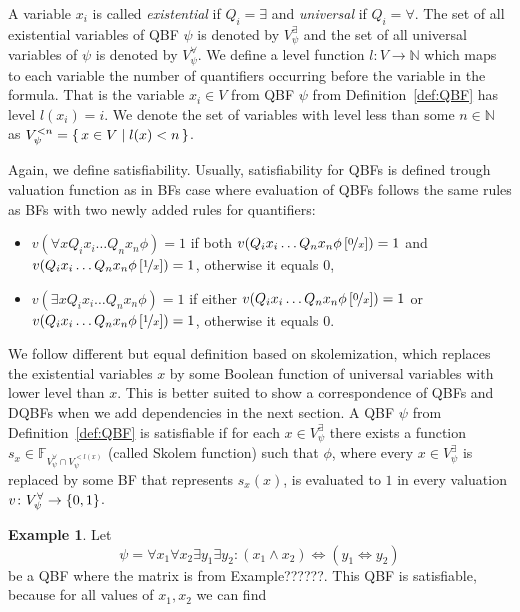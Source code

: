\documentclass[
  digital, %
  twoside, %
  table,   %
  nolof,     %
  nolot,     %
]{fithesis3}
\let\setbuilder\set
\newcommand{\simpleset}[1]{\{{#1}\}}
\renewcommand{\set}[1]{\normalexpandarg\IfSubStr{#1}{|}{\setbuilder{#1}}{\simpleset{#1}}}
\theoremstyle{definition}
\newtheorem{example}{Example}
\theoremstyle{remark}
\newcommand{\substitute}[2]{\left[ \nicefrac{#2}{#1} \right]}
\newcommand{\BFuncs}[1]{\mathbb{F}_{#1}}
\newcommand{\evars}[1]{V_{#1}^{\exists}}
\newcommand{\uvars}[1]{V_{#1}^{\forall}}
\newcommand{\lequal}{\Leftrightarrow}
\begin{document}
A variable $x_i$ is called \emph{existential} if $Q_i = \exists$ and \emph{universal} if $Q_i = \forall$. The set of all existential variables of QBF $\psi$ is denoted by $\evars{\psi}$ and the set of all universal variables of $\psi$ is denoted by $\uvars{\psi}$. We define a level function $l\colon V \to \mathbb{N}$ which maps to each variable the number of quantifiers occurring before the variable in the formula. That is the variable $x_i \in V$ from QBF $\psi$ from Definition~\ref{def:QBF} has level $l(x_i) = i$. We denote the set of variables with level less than some $n \in \mathbb{N}$ as $V_{\psi}^{<n} = \set{x \in V | l(x) < n}$.

Again, we define satisfiability. Usually, satisfiability for QBFs is defined trough valuation function as in BFs case where evaluation of QBFs follows the same rules as BFs with two newly added rules for quantifiers:
\begin{itemize}
    \item $v(\forall x Q_i x_i \dots Q_n x_n \phi) = 1$ if both $v(Q_i x_i \dots Q_n x_n \phi\substitute{x}{0}) = 1$ and $v(Q_i x_i \dots Q_n x_n \phi\substitute{x}{1}) = 1$, otherwise it equals $0$,
    \item $v(\exists x Q_i x_i \dots Q_n x_n \phi) = 1$ if either $v(Q_i x_i \dots Q_n x_n \phi\substitute{x}{0}) = 1$ or $v(Q_i x_i \dots Q_n x_n \phi\substitute{x}{1}) = 1$, otherwise it equals $0$.
\end{itemize}
We follow different but equal definition based on skolemization, which replaces the existential variables $x$ by some Boolean function of universal variables with lower level than $x$. This is better suited to show a correspondence of QBFs and DQBFs when we add dependencies in the next section. A QBF $\psi$ from Definition~\ref{def:QBF} is satisfiable if for each $x \in V_{\psi}^{\exists}$ there exists a function $s_{x} \in \BFuncs{\uvars{\psi}\cap V_{\psi}^{<l(x)}}$ (called Skolem function) such that $\phi$, where every $x \in \evars{\psi}$ is replaced by some BF that represents $s_x(x)$, is evaluated to $1$ in every valuation $v\colon \uvars{\psi} \to \set{0,1}$.

\begin{example}
Let 
\[\psi = \forall x_1 \forall x_2 \exists y_1  \exists y_2  : (x_1 \land x_2) \lequal (y_1 \lequal y_2)\]
be a QBF where the matrix is from Example??????. This QBF is satisfiable, because for all values of $x_1, x_2$ we can find
\end{example}
\end{document}
